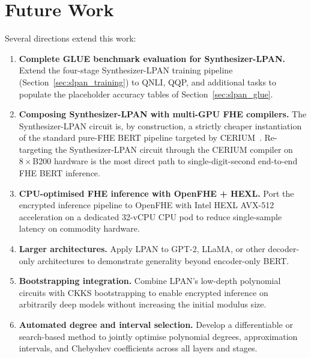 \section{Future Work}

Several directions extend this work:

\begin{enumerate}
    \item \textbf{Complete GLUE benchmark evaluation for Synthesizer-LPAN.} Extend the four-stage Synthesizer-LPAN training pipeline (Section~\ref{sec:slpan_training}) to QNLI, QQP, and additional tasks to populate the placeholder accuracy tables of Section~\ref{sec:slpan_glue}.

    \item \textbf{Composing Synthesizer-LPAN with multi-GPU FHE compilers.} The Synthesizer-LPAN circuit is, by construction, a strictly cheaper instantiation of the standard pure-FHE BERT pipeline targeted by CERIUM~\cite{cerium2025}. Re-targeting the Synthesizer-LPAN circuit through the CERIUM compiler on $8\times$B200 hardware is the most direct path to single-digit-second end-to-end FHE BERT inference.

    \item \textbf{CPU-optimised FHE inference with OpenFHE + HEXL.} Port the encrypted inference pipeline to OpenFHE with Intel HEXL AVX-512 acceleration on a dedicated 32-vCPU CPU pod to reduce single-sample latency on commodity hardware.

    \item \textbf{Larger architectures.} Apply LPAN to GPT-2, LLaMA, or other decoder-only architectures to demonstrate generality beyond encoder-only BERT.

    \item \textbf{Bootstrapping integration.} Combine LPAN's low-depth polynomial circuits with CKKS bootstrapping to enable encrypted inference on arbitrarily deep models without increasing the initial modulus size.

    \item \textbf{Automated degree and interval selection.} Develop a differentiable or search-based method to jointly optimise polynomial degrees, approximation intervals, and Chebyshev coefficients across all layers and stages.
\end{enumerate}
